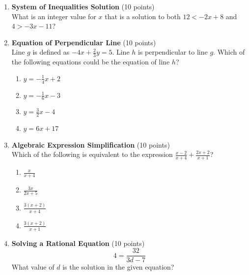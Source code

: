 \begin{enumerate}
  \newpage


  \item \textbf{System of Inequalities Solution} (10 points)\\
  What is an integer value for $x$ that is a solution to both $12<-2 x+8$ and $4>-3 x-11$?
  \begin{subanswer}
  \end{subanswer}

  \item \textbf{Equation of Perpendicular Line} (10 points)\\
  Line $g$ is defined as $-4 x+\frac{2}{3} y=5$. Line $h$ is perpendicular to line $g$. Which of the following equations could be the equation of line $h$?
  \begin{enumerate}[label=(\Alph*)]
    \item $y=-\frac{1}{4} x+2$
    \item $y=-\frac{1}{6} x-3$
    \item $y=\frac{3}{2} x-4$
    \item $y=6 x+17$
  \end{enumerate}
  \begin{subanswer}
  \end{subanswer}

  \item \textbf{Algebraic Expression Simplification} (10 points)\\
  Which of the following is equivalent to the expression $\frac{x-2}{x+4}+\frac{2 x+2}{x+1}$?
  \begin{enumerate}[label=(\Alph*)]
    \item $\frac{x}{x+4}$
    \item $\frac{3 x}{2 x+5}$
    \item $\frac{3(x+2)}{x+4}$
    \item $\frac{3(x+2)}{x+1}$
  \end{enumerate}
  \begin{subanswer}
  \end{subanswer}


  \item \textbf{Solving a Rational Equation} (10 points)\\
  \[
    4=\frac{32}{3 d-7}
  \]
  What value of $d$ is the solution in the given equation?
  \begin{subanswer}
  \end{subanswer}


\end{enumerate}

